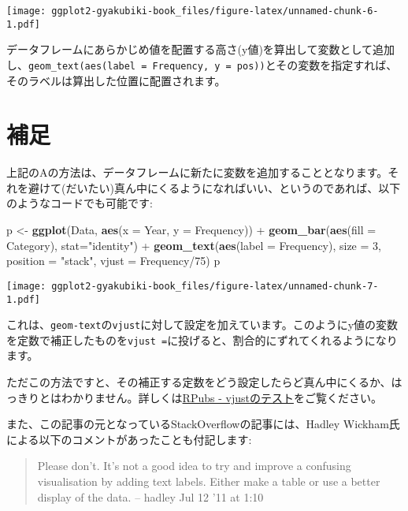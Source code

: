 \documentclass[]{book}
\newenvironment{Shaded}{\begin{snugshade}}{\end{snugshade}}
\newcommand{\KeywordTok}[1]{\textcolor[rgb]{0.13,0.29,0.53}{\textbf{{#1}}}}
\newcommand{\DataTypeTok}[1]{\textcolor[rgb]{0.13,0.29,0.53}{{#1}}}
\newcommand{\DecValTok}[1]{\textcolor[rgb]{0.00,0.00,0.81}{{#1}}}
\newcommand{\StringTok}[1]{\textcolor[rgb]{0.31,0.60,0.02}{{#1}}}
\newcommand{\NormalTok}[1]{{#1}}
\begin{document}
\texttt{[image: ggplot2-gyakubiki-book\_files/figure-latex/unnamed-chunk-6-1.pdf]}

データフレームにあらかじめ値を配置する高さ(y値)を算出して変数として追加し、\texttt{geom\_text(aes(label\ =\ Frequency,\ y\ =\ pos))}とその変数を指定すれば、そのラベルは算出した位置に配置されます。

\section{補足}

上記のAの方法は、データフレームに新たに変数を追加することとなります。それを避けて(だいたい)真ん中にくるようになればいい、というのであれば、以下のようなコードでも可能です:

\begin{Shaded}
\begin{Highlighting}[]
\NormalTok{p <-}\StringTok{ }\KeywordTok{ggplot}\NormalTok{(Data, }\KeywordTok{aes}\NormalTok{(}\DataTypeTok{x =} \NormalTok{Year, }\DataTypeTok{y =} \NormalTok{Frequency)) +}
\StringTok{  }\KeywordTok{geom_bar}\NormalTok{(}\KeywordTok{aes}\NormalTok{(}\DataTypeTok{fill =} \NormalTok{Category), }\DataTypeTok{stat=}\StringTok{"identity"}\NormalTok{) +}
\StringTok{  }\KeywordTok{geom_text}\NormalTok{(}\KeywordTok{aes}\NormalTok{(}\DataTypeTok{label =} \NormalTok{Frequency), }\DataTypeTok{size =} \DecValTok{3}\NormalTok{, }\DataTypeTok{position =} \StringTok{"stack"}\NormalTok{, }\DataTypeTok{vjust =} \NormalTok{Frequency/}\DecValTok{75}\NormalTok{)}
\NormalTok{p}
\end{Highlighting}
\end{Shaded}

\texttt{[image: ggplot2-gyakubiki-book\_files/figure-latex/unnamed-chunk-7-1.pdf]}

これは、\texttt{geom-text}の\texttt{vjust}に対して設定を加えています。このようにy値の変数を定数で補正したものを\texttt{vjust\ =}に投げると、割合的にずれてくれるようになります。

ただこの方法ですと、その補正する定数をどう設定したらど真ん中にくるか、はっきりとはわかりません。詳しくは\href{https://rpubs.com/kazutan/vjust_test}{RPubs
- vjustのテスト}をご覧ください。

また、この記事の元となっているStackOverflowの記事には、Hadley
Wickham氏による以下のコメントがあったことも付記します:

\begin{quote}
Please don't. It's not a good idea to try and improve a confusing
visualisation by adding text labels. Either make a table or use a better
display of the data. -- hadley Jul 12 '11 at 1:10
\end{quote}
\end{document}
